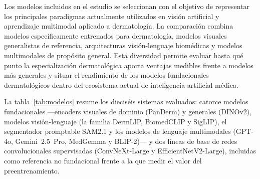 Los modelos incluidos en el estudio se seleccionan con el objetivo
de representar los principales paradigmas actualmente utilizados en
visión artificial y aprendizaje multimodal aplicado a dermatología.
La comparación combina modelos específicamente entrenados para
dermatología, modelos visuales generalistas de referencia,
arquitecturas visión-lenguaje biomédicas y modelos multimodales de
propósito general. Esta diversidad permite evaluar hasta qué punto
la especialización dermatológica aporta ventajas medibles frente a
modelos más generales y situar el rendimiento de los modelos
fundacionales dermatológicos dentro del ecosistema actual de
inteligencia artificial médica.

La tabla~\ref{tab:modelos} resume los dieciséis sistemas evaluados:
catorce modelos fundacionales ---encoders visuales de dominio
(PanDerm) y generales (DINOv2), modelos visión-lenguaje (la familia
DermLIP, BiomedCLIP y SigLIP), el segmentador promptable SAM2.1 y
los modelos de lenguaje multimodales (GPT-4o, Gemini~2.5~Pro,
MedGemma y BLIP-2)--- y dos líneas de base de redes convolucionales
supervisadas (ConvNeXt-Large y EfficientNetV2-Large), incluidas como
referencia no fundacional frente a la que medir el valor del
preentrenamiento.

